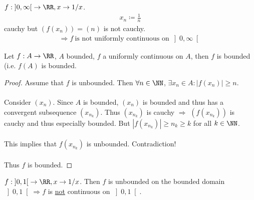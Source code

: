\documentclass[class=scrartcl, crop=false]{standalone}
\begin{document}
\begin{example}
  $f: \left]0, \infty\right[ \to \RR, x \to 1 / x$.
  \begin{gather*}
    x_n \coloneqq \frac{1}{n}
  \end{gather*} cauchy but $(f(x_n)) = (n)$ is not cauchy.
  \begin{gather*}
    \Rightarrow f \ \text{is not uniformly continuous on} \ \left]0, \infty\right[
  \end{gather*} 
\end{example} 

\begin{theorem}
  Let $f: A \to \RR$, $A$ bounded, $f$ a uniformly continuous on $A$, then $f$ is bounded (i.e. $f(A)$ is bounded.
  \begin{proof}
    Assume that $f$ is unbounded. Then $\forall n \in \NN$, $\exists x_n \in A : |f(x_n)| \geq n$.
    \\\\
    Consider $(x_n)$. Since $A$ is bounded, $(x_n)$ is bounded and thus has a convergent subsequence $(x_{n_k})$. Thus $(x_{n_k})$ is cauchy $\Rightarrow$ $(f(x_{n_k}))$ is cauchy and thus especially bounded. But  $|f(x_{n_k})| \geq n_k \geq k$ for all $k \in \NN$.
    \\\\
    This implies that $f(x_{n_k})$ is unbounded. Contradiction!
    \\\\
    Thus $f$ is bounded.
  \end{proof} 
\end{theorem} 

\begin{example}
  $f : \left]0, 1\right[ \to \RR, x \to 1 / x$. Then $f$ is unbounded on the bounded domain $\left]0, 1\right[ \Rightarrow f$ is \ul{not} continuous on $\left]0, 1\right[$.
\end{example} 
\end{document}
